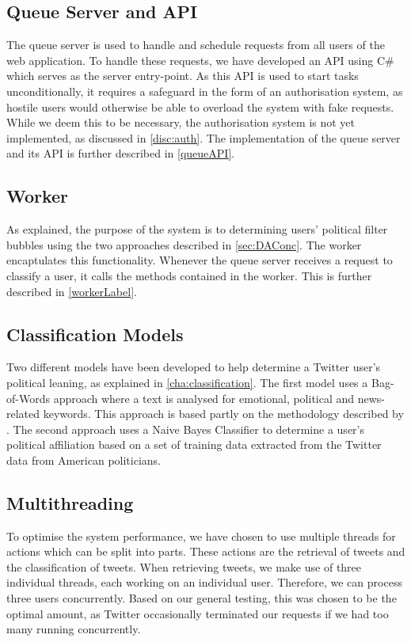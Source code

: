 \subsection{Queue Server and API}
The queue server is used to handle and schedule requests from all users of 
the web application. To handle these requests, we have developed an API using
C\# which serves as the server entry-point. As this API is used to start tasks
unconditionally, it requires a safeguard in the form of an authorisation system,
as hostile users would otherwise be able to overload the system with fake
requests. While we deem this to be necessary, the authorisation system is not
yet implemented, as discussed in \autoref{disc:auth}. The implementation of the
queue server and its API is further described in \autoref{queueAPI}.

\subsection{Worker}
As explained, the purpose of the system is to determining users' political
filter bubbles using the two approaches described in \autoref{sec:DAConc}. The
worker encaptulates this functionality. Whenever the queue server receives a
request to classify a user, it calls the methods contained in the worker. This is
further described in \autoref{workerLabel}.

\subsection{Classification Models}
Two different models have been developed to help determine a Twitter user's
political leaning, as explained in \autoref{cha:classification}. The first model
uses a Bag-of-Words approach where a text is analysed for emotional, political
and news-related keywords. This approach is based partly on the methodology
described by . The second approach uses a Naive
Bayes Classifier to determine a user's political affiliation based on a set of
training data extracted from the Twitter data from American politicians.

\subsection{Multithreading}\label{subs:multithread}
To optimise the system performance, we have chosen to use multiple threads for
actions which can be split into parts. These actions are the retrieval of
tweets and the classification of tweets. When retrieving tweets, we
make use of three individual threads, each working on an individual user.
Therefore, we can process three users concurrently. Based on our general
testing, this was chosen to be the optimal amount, as Twitter occasionally
terminated our requests if we had too many running concurrently.\nl

